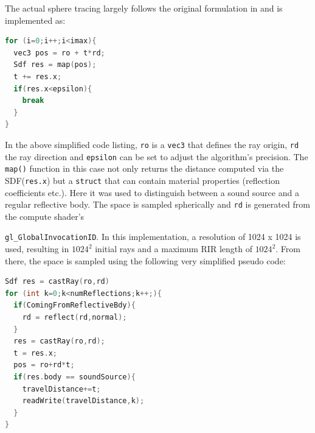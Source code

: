 \documentclass[twoside,a4paper]{article}
\begin{document}
The actual sphere tracing largely follows the original formulation in \cite{hart_sphere_1996} and is implemented as:

\begin{lstlisting}[language=C, caption={\it GLSL pseudo code for sphere tracing},captionpos=b,label=lst:sphereTrace]
for (i=0;i++;i<imax){
  vec3 pos = ro + t*rd;
  Sdf res = map(pos);
  t += res.x;
  if(res.x<epsilon){
    break
  }
}
\end{lstlisting} 

In the above simplified code listing, \texttt{ro} is a \texttt{vec3} that defines the ray origin, \texttt{rd} the ray direction and \texttt{epsilon} can be set to adjust the algorithm's precision. The \texttt{map()} function in this case not only returns the distance computed via the SDF(\texttt{res.x}) but a \texttt{struct} that can contain material properties (reflection coefficients etc.). Here it was used to distinguish between a sound source and a regular reflective body.
The space is sampled spherically and \texttt{rd} is generated from the compute shader's \

 \texttt{gl\_GlobalInvocationID}. In this implementation, a resolution of 1024 x 1024 is used, resulting in $1024^2$ initial rays and a maximum RIR length of $1024^2$.
From there, the space is sampled using the following very simplified pseudo code:




\begin{lstlisting}[float,floatplacement=H, language=C, caption={\it GLSL pseudo code for sampling the space and writing to the RIR.},captionpos=b, label=lst:mainloop]
Sdf res = castRay(ro,rd)
for (int k=0;k<numReflections;k++;){
  if(ComingFromReflectiveBdy){
    rd = reflect(rd,normal);
  }
  res = castRay(ro,rd);
  t = res.x;
  pos = ro+rd*t;
  if(res.body == soundSource){
    travelDistance+=t;
    readWrite(travelDistance,k);
  }
}

\end{lstlisting}
\end{document}
